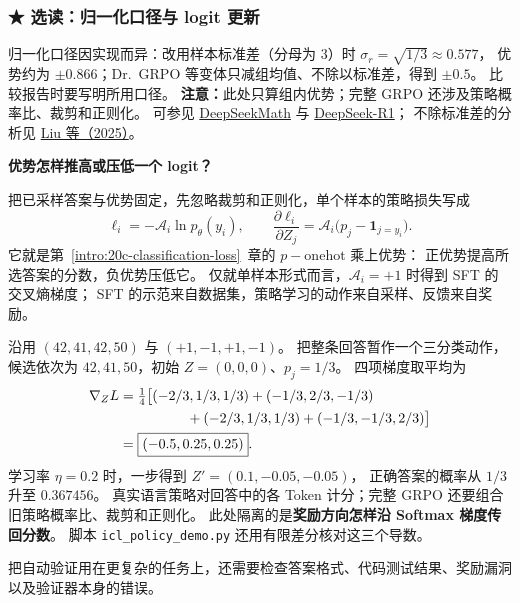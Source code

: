 \subsubsection*{\texorpdfstring{{\symboliconfont ★}}{★} 选读：归一化口径与 logit 更新}
归一化口径因实现而异：改用样本标准差（分母为 $3$）时 $\sigma_r=\sqrt{1/3}\approx0.577$，
优势约为 $\pm0.866$；Dr.~GRPO 等变体只减组均值、不除以标准差，得到 $\pm0.5$。
比较报告时要写明所用口径。
\textbf{注意：}此处只算组内优势；完整 GRPO 还涉及策略概率比、裁剪和正则化。
可参见 \href{https://arxiv.org/html/2402.03300v3}{DeepSeekMath}
与 \href{https://arxiv.org/abs/2501.12948}{DeepSeek-R1}；
不除标准差的分析见 \href{https://arxiv.org/abs/2503.20783}{Liu 等（2025）}。

\noindent\textbf{优势怎样推高或压低一个 logit？}\par
把已采样答案与优势固定，先忽略裁剪和正则化，单个样本的策略损失写成
\[
\ell_i=-\mathcal A_i\ln p_\theta(y_i),\qquad
\frac{\partial\ell_i}{\partial Z_j}
=\mathcal A_i\bigl(p_j-\mathbf1_{j=y_i}\bigr).
\]
它就是第~\ref*{intro:20c-classification-loss}~章的 $p-\mathrm{onehot}$ 乘上优势：
正优势提高所选答案的分数，负优势压低它。
仅就单样本形式而言，$\mathcal A_i=+1$ 时得到 SFT 的交叉熵梯度；
SFT 的示范来自数据集，策略学习的动作来自采样、反馈来自奖励。

沿用 $(42,41,42,50)$ 与 $(+1,-1,+1,-1)$。
把整条回答暂作一个三分类动作，候选依次为 $42,41,50$，初始 $Z=(0,0,0)$、$p_j=1/3$。
四项梯度取平均为
\[
\begin{aligned}
\nabla_Z L
&=\tfrac14\bigl[(-2/3,1/3,1/3)+(-1/3,2/3,-1/3)\\
&\hspace{17mm}+(-2/3,1/3,1/3)+(-1/3,-1/3,2/3)\bigr]\\
&=\boxed{(-0.5,0.25,0.25)}.
\end{aligned}
\]
学习率 $\eta=0.2$ 时，一步得到 $Z'=(0.1,-0.05,-0.05)$，
正确答案的概率从 $1/3$ 升至 $\boxed{0.367456}$。
真实语言策略对回答中的各 Token 计分；完整 GRPO 还要组合旧策略概率比、裁剪和正则化。
此处隔离的是\textbf{奖励方向怎样沿 Softmax 梯度传回分数}。
脚本 \texttt{icl\_policy\_demo.py} 还用有限差分核对这三个导数。

把自动验证用在更复杂的任务上，还需要检查答案格式、代码测试结果、奖励漏洞以及验证器本身的错误。

